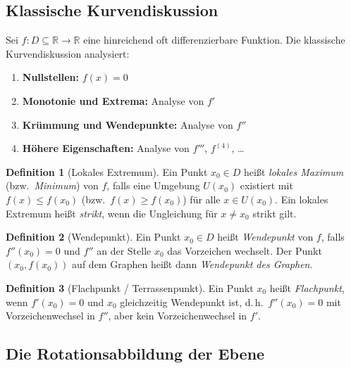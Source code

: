 ﻿\documentclass[12pt, a4paper]{article}
\theoremstyle{definition}
\newtheorem{definition}{Definition}[section]
\begin{document}
	\subsection{Klassische Kurvendiskussion}
	
	Sei $f: D \subseteq \mathbb{R} \to \mathbb{R}$ eine hinreichend oft
	differenzierbare Funktion. Die klassische Kurvendiskussion analysiert:
	
	\begin{enumerate}[label=\arabic*.]
		\item \textbf{Nullstellen:} $f(x) = 0$
		\item \textbf{Monotonie und Extrema:} Analyse von $f'$
		\item \textbf{Krümmung und Wendepunkte:} Analyse von $f''$
		\item \textbf{Höhere Eigenschaften:} Analyse von $f'''$, $f^{(4)}$, \ldots
	\end{enumerate}
	
	\begin{definition}[Lokales Extremum]
		Ein Punkt $x_0 \in D$ heißt \emph{lokales Maximum} (bzw.\ \emph{Minimum})
		von $f$, falls eine Umgebung $U(x_0)$ existiert mit
		$f(x) \leq f(x_0)$ (bzw.\ $f(x) \geq f(x_0)$) für alle $x \in U(x_0)$.
		Ein lokales Extremum heißt \emph{strikt}, wenn die Ungleichung für
		$x \neq x_0$ strikt gilt.
	\end{definition}
	
	\begin{definition}[Wendepunkt]
		Ein Punkt $x_0 \in D$ heißt \emph{Wendepunkt} von $f$, falls $f''(x_0) = 0$
		und $f''$ an der Stelle $x_0$ das Vorzeichen wechselt. Der Punkt
		$(x_0, f(x_0))$ auf dem Graphen heißt dann \emph{Wendepunkt des Graphen}.
	\end{definition}
	
	\begin{definition}[Flachpunkt / Terrassenpunkt]
		Ein Punkt $x_0$ heißt \emph{Flachpunkt}, wenn $f'(x_0) = 0$ und $x_0$
		gleichzeitig Wendepunkt ist, d.\,h.\ $f''(x_0) = 0$ mit Vorzeichenwechsel
		in $f''$, aber kein Vorzeichenwechsel in $f'$.
	\end{definition}
	
	\subsection{Die Rotationsabbildung der Ebene}
	
\end{document}
